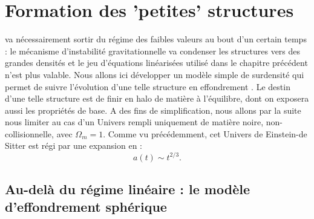 \chapter{Formation des 'petites' structures}
 va nécessairement sortir du régime des faibles valeurs au bout d'un certain temps : le mécanisme d'instabilité gravitationnelle va condenser les structures vers des grandes densités et le jeu d'équations linéarisées utilisé dans le chapitre précédent n'est plus valable. Nous allons ici développer un modèle simple de surdensité qui permet de suivre l'évolution d'une telle structure en effondrement . Le destin d'une telle structure est de finir en halo de matière à l'équilibre, dont on exposera aussi les propriétés de base. A des fins de simplification, nous allons par la suite nous limiter au cas d'un Univers rempli uniquement de matière noire, non-collisionnelle, avec $\Omega_m=1$. Comme vu précédemment, cet Univers de Einstein-de Sitter est régi par une expansion en :
\begin{equation}
a(t) \sim t^{2/3}.
\end{equation}

\section{Au-delà du régime linéaire : le modèle d'effondrement sphérique}

